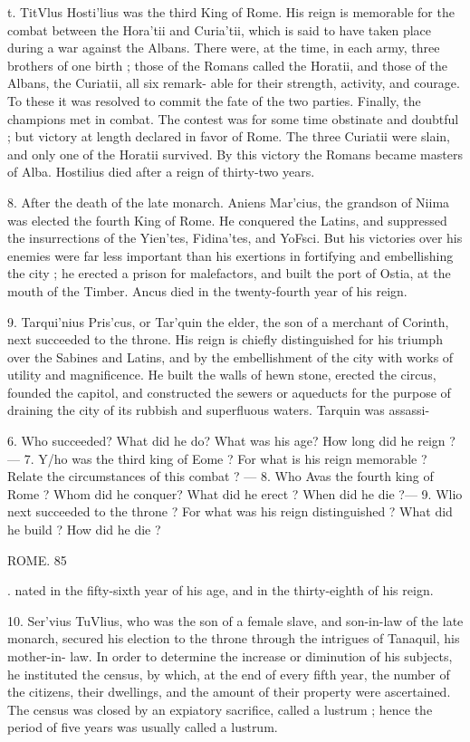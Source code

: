 \documentclass[openany,a4paper]{memoir}
\begin{document}
{t. TitVlus Hosti'lius was the third King of Rome. His 
reign is memorable for the combat between the Hora'tii and 
Curia'tii, which is said to have taken place during a war 
against the Albans. There were, at the time, in each army, 
three brothers of one birth ; those of the Romans called the 
Horatii, and those of the Albans, the Curiatii, all six remark- 
able for their strength, activity, and courage. To these it 
was resolved to commit the fate of the two parties. Finally, 
the champions met in combat. The contest was for some 
time obstinate and doubtful ; but victory at length declared 
in favor of Rome. The three Curiatii were slain, and only one 
of the Horatii survived. By this victory the Romans became 
masters of Alba. Hostilius died after a reign of thirty-two 
years. 

8. After the death of the late monarch. Aniens Mar'cius, 
the grandson of Niima was elected the fourth King of Rome. 
He conquered the Latins, and suppressed the insurrections 
of the Yien'tes, Fidina'tes, and YoFsci. But his victories 
over his enemies were far less important than his exertions 
in fortifying and embellishing the city ; he erected a prison 
for malefactors, and built the port of Ostia, at the mouth of 
the Timber. Ancus died in the twenty-fourth year of his reign. 

9. Tarqui'nius Pris'cus, or Tar'quin the elder, the son of 
a merchant of Corinth, next succeeded to the throne. His 
reign is chiefly distinguished for his triumph over the Sabines 
and Latins, and by the embellishment of the city with works 
of utility and magnificence. He built the walls of hewn 
stone, erected the circus, founded the capitol, and constructed 
the sewers or aqueducts for the purpose of draining the city 
of its rubbish and superfluous waters. Tarquin was assassi- 

6. Who succeeded? What did he do? What was his age? How 
long did he reign ? — 7. Y/ho was the third king of Eome ? For what 
is his reign memorable ? Relate the circumstances of this combat ? — 
8. Who Avas the fourth king of Rome ? Whom did he conquer? What 
did he erect ? When did he die ?— 9. Wlio next succeeded to the throne ? 
For what was his reign distinguished ? What did he build ? How did 
he die ? 



ROME. 85 

. nated in the fifty-sixth year of his age, and in the thirty-eighth 
of his reign. 

10. Ser'vius TuVlius, who was the son of a female slave, 
and son-in-law of the late monarch, secured his election to 
the throne through the intrigues of Tanaquil, his mother-in- 
law. In order to determine the increase or diminution of 
his subjects, he instituted the census, by which, at the end of 
every fifth year, the number of the citizens, their dwellings, and 
the amount of their property were ascertained. The census 
was closed by an expiatory sacrifice, called a lustrum ; hence 
the period of five years was usually called a lustrum. 

}
\end{document}
